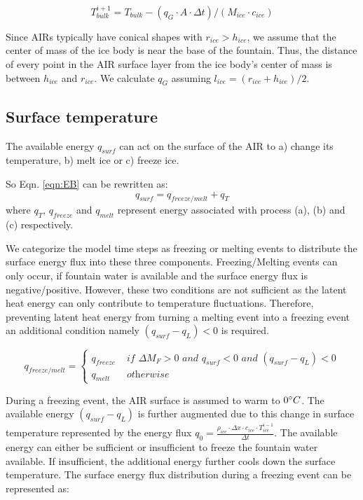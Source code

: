 \documentclass[utf8]{frontiersSCNS} %
\begin{document}
\begin{equation} T_{bulk}^{i+1} = T_{bulk} - (q_{G} \cdot A \cdot \Delta t)/(M_{ice} \cdot c_{ice}) \end{equation}

Since AIRs typically have conical shapes with $r_{ice} > h_{ice}$, we assume that the center of mass of the ice body is
near the base of the fountain. Thus, the distance of every point in the AIR surface layer from the ice body's center of
mass is between $h_{ice}$ and $r_{ice}$. We calculate $q_{G}$ assuming $l_{ice} = (r_{ice} + h_{ice})/2$.


\subsection{Surface temperature}

The available energy $q_{surf}$ can act on the surface of the AIR to a) change its temperature, b) melt ice or c) freeze
ice.

So Eqn. \ref{eqn:EB} can be rewritten as: \begin{equation} q_{surf} = q_{freeze/melt} + q_{T} \end{equation} where
$q_{T}$, $q_{freeze}$ and $q_{melt}$ represent energy associated with process (a), (b) and (c) respectively.

We categorize the model time steps as freezing or melting events to distribute the surface energy flux into these three
components. Freezing/Melting events can only occur, if fountain water is available and the surface energy flux is
negative/positive. However, these two conditions are not sufficient as the latent heat energy can only contribute to
temperature fluctuations. Therefore, preventing latent heat energy from turning a melting event into a freezing event an
additional condition namely $(q_{surf}-q_{L}) < 0$ is required.

\begin{equation}
	q_{freeze/melt} = \left\{ \begin{array}{ll}
		q_{freeze} & \textit{ if } \Delta M_{F} > 0 \textit{ and } q_{surf} < 0 \textit{ and }(q_{surf}-q_{L}) < 0 \\
		q_{melt}   & \textit{ otherwise}
	\end{array} \right.
\end{equation}

During a freezing event, the AIR surface is assumed to warm to $0 \degree C$. The available energy $(q_{surf}-q_{L})$ is
further augmented due to this change in surface temperature represented by the energy flux $q_{0} = \frac{\rho_{ice}
		\cdot \Delta x \cdot c_{ice} \cdot T_{ice}^{i-1}}{\Delta t}$. The available energy can either be sufficient or
insufficient to freeze the fountain water available. If insufficient, the additional energy further cools down the
surface temperature. The surface energy flux distribution during a freezing event can be represented as:
\end{document}
